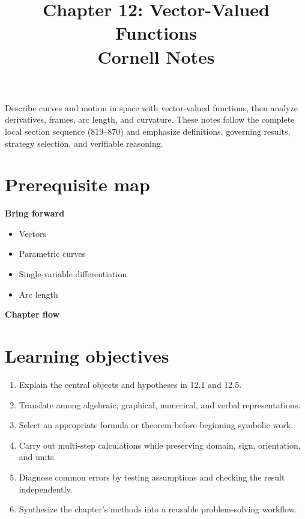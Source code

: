 \documentclass[11pt]{article}
\title{Chapter 12: Vector-Valued Functions\\[2mm]\large Cornell Notes}
\author{}
\date{}
\begin{document}
\maketitle
\thispagestyle{fancy}
\begin{orientationbox}
Describe curves and motion in space with vector-valued functions, then analyze derivatives, frames, arc length, and curvature. These notes follow the complete local section sequence (819--870) and emphasize definitions, governing results, strategy selection, and verifiable reasoning.
\end{orientationbox}

\section{Prerequisite map}
\begin{minipage}[t]{0.42\textwidth}
\textbf{Bring forward}
\begin{itemize}
\item Vectors
\item Parametric curves
\item Single-variable differentiation
\item Arc length
\end{itemize}
\end{minipage}\hfill
\begin{minipage}[t]{0.54\textwidth}
\textbf{Chapter flow}
\begin{center}
\end{center}
\end{minipage}

\section{Learning objectives}
\begin{enumerate}
\item Explain the central objects and hypotheses in 12.1 and 12.5.
\item Translate among algebraic, graphical, numerical, and verbal representations.
\item Select an appropriate formula or theorem before beginning symbolic work.
\item Carry out multi-step calculations while preserving domain, sign, orientation, and units.
\item Diagnose common errors by testing assumptions and checking the result independently.
\item Synthesize the chapter's methods into a reusable problem-solving workflow.
\end{enumerate}
\end{document}
